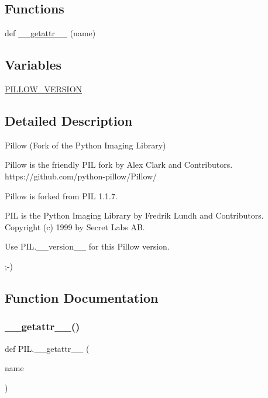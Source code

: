 \subsection*{Functions}
\begin{DoxyCompactItemize}
\item 
def \hyperlink{namespacePIL_ad8131a49e60cdb3194904207d772f0a0}{\+\_\+\+\_\+getattr\+\_\+\+\_\+} (name)
\end{DoxyCompactItemize}
\subsection*{Variables}
\begin{DoxyCompactItemize}
\item 
\hyperlink{namespacePIL_a94f62ae0de6146836b1733922670906c}{P\+I\+L\+L\+O\+W\+\_\+\+V\+E\+R\+S\+I\+ON}
\end{DoxyCompactItemize}


\subsection{Detailed Description}
\begin{DoxyVerb}Pillow (Fork of the Python Imaging Library)

Pillow is the friendly PIL fork by Alex Clark and Contributors.
    https://github.com/python-pillow/Pillow/

Pillow is forked from PIL 1.1.7.

PIL is the Python Imaging Library by Fredrik Lundh and Contributors.
Copyright (c) 1999 by Secret Labs AB.

Use PIL.__version__ for this Pillow version.

;-)
\end{DoxyVerb}
 

\subsection{Function Documentation}
\mbox{\label{namespacePIL_ad8131a49e60cdb3194904207d772f0a0}} 
\subsubsection{\texorpdfstring{\+\_\+\+\_\+getattr\+\_\+\+\_\+()}{\_\_getattr\_\_()}}
{\footnotesize\ttfamily def P\+I\+L.\+\_\+\+\_\+getattr\+\_\+\+\_\+ (\begin{DoxyParamCaption}\item[{}]{name }\end{DoxyParamCaption})}



